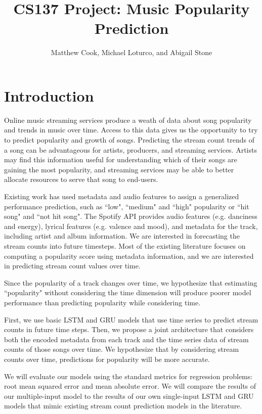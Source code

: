 \documentclass[11pt]{article}
\title{CS137 Project: Music Popularity Prediction}
\author{Matthew Cook, Michael Loturco, and Abigail Stone}
\date{}
\begin{document}
\maketitle

\section{Introduction}

Online music streaming services produce a weath of data about song popularity and trends in music over time. Access to this data gives us the opportunity to try to predict popularity and growth of songs. Predicting the stream count trends of a song can be advantageous for artists, producers, and streaming services. Artists may find this information useful for understanding which of their songs are gaining the most popularity, and streaming services may be able to better allocate resources to serve that song to end-users.

Existing work \cite{araujo_predicting_2019, martin-gutierrez_multimodal_2020} has used metadata and audio features to assign a generalized performance prediction, such as ``low", ``medium" and ``high" popularity or ``hit song" and ``not hit song". The Spotify API \cite{noauthor_spotify_nodate} provides audio features (e.g. danciness and energy), lyrical features (e.g. valence and mood), and metadata for the track, including artist and album information. We are interested in forecasting the stream counts into future timesteps. Most of the existing literature focuses on computing a popularity score using metadata information, and we are interested in predicting stream count values over time. 

Since the popularity of a track changes over time, we hypothesize that estimating ``popularity" without considering the time dimension will produce poorer model performance than predicting popularity while considering time. 

First, we use basic LSTM and GRU models that use time series to predict stream counts in future time steps. Then, we propose a joint architecture that considers both the encoded metadata from each track and the time series data of stream counts of those songs over time. We hypothesize that by considering stream counts over time, predictions for popularity will be more accurate. 

We will evaluate our models using the standard metrics for regression problems: root mean squared error and mean absolute error. We will compare the results of our multiple-input model to the results of our own single-input LSTM and GRU models that mimic existing stream count prediction models in the literature.
\end{document}
